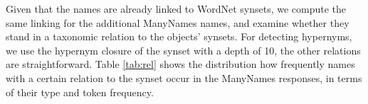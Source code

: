 Given that the \vg names are already linked to WordNet synsets, we compute the same linking for the additional ManyNames names, and examine whether they stand in a taxonomic relation to the objects'  \vg  synsets.
For detecting hypernyms, we use the hypernym closure of the synset with a depth of 10, the other relations are straightforward. 
%
Table \ref{tab:rel} shows the distribution
how frequently names with a certain relation to the synset occur in the ManyNames responses, in terms of their  type and token frequency. 
